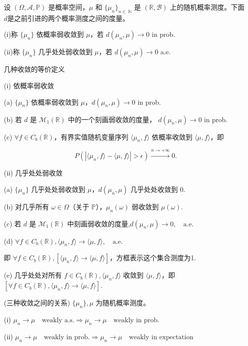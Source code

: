 \begin{definition}
    设 \((\Omega, \mathcal{A}, \mathbb{P})\) 是概率空间，\(\mu\) 和 \(\{\mu_n\}_{n\in\ \mathbb{N}}\) 是 \((\mathbb{R}, \mathcal{B})\) 上的随机概率测度。下面$d$是之前引进的两个概率测度之间的度量。

(i)称 \(\{\mu_n\}\) 依概率弱收敛到 \(\mu\)，若 \(d(\mu_n, \mu) \to 0\) in prob.

(ii)称 \(\{\mu_n\}\) 几乎处处弱收敛到 \(\mu\)，若 \(d(\mu_n,\mu) \to 0\) a.e.
\end{definition}

\begin{theorem}{几种收敛的等价定义}
   
    (i) 依概率弱收敛

(a) \(\{\mu_n\}\) 依概率弱收敛到 \(\mu\)，\(d(\mu_n, \mu) \to 0\) in prob.

(b) 若 \(d\) 是 \(\mathcal{M}_1(\mathbb{R})\) 中的一个刻画弱收敛的度量， \(d( \mu_n,  \mu) \to 0\) in prob.

(c) \(\forall f \in C_b(\mathbb{R})\)，有界实值随机变量序列 \(\langle  \mu_n, f \rangle\) 依概率收敛到 \(\langle  \mu, f \rangle\)，即

\begin{equation*}
P(|\langle  \mu_n, f \rangle - \langle  \mu, f \rangle| > \epsilon) \xrightarrow{n \to +\infty} 0.
\end{equation*}

(ii) 几乎处处弱收敛

(a) \(\{ \mu_n\}\) 几乎处处弱收敛到 \( \mu\)，\(d( \mu_n,  \mu)\) 几乎处处收敛到 \(0\).

(b) 对几乎所有 \(\omega \in \Omega\)（关于 \(\mathbb{P}\)），\( \mu_n(\omega)\) 弱收敛到 \( \mu(\omega)\).

(c) 若 \(d\) 是 \(\mathcal{M}_1(\mathbb{R})\) 中刻画弱收敛的度量,\(d( \mu_n,  \mu) \to 0 , \quad \text{a.e}\).

(d) \(\forall f \in C_b(\mathbb{R}), \langle \mu_n, f \rangle \to \langle\mu, f \rangle, \quad \text{a.e.}\)

即 \(\forall f \in C_b(\mathbb{R}), [\langle \mu_n, f \rangle \to \langle \mu, f \rangle]\)，方框表示这个集合测度为1.

(e) 几乎处处对所有 \(f \in C_b(\mathbb{R}), \langle \mu_n, f \rangle\) 收敛到 \(\langle \mu, f \rangle\)，即
\([\forall f \in C_b(\mathbb{R}), \langle \mu_n, f \rangle \to \langle \mu, f \rangle]\).

\end{theorem}
\begin{theorem}{(三种收敛之间的关系)}
    \(\{\mu_n\}, \mu\) 为随机概率测度。

(i) \(\mu_n \to\mu \quad \text{weakly a.s.} \Rightarrow \mu_n \to \mu \quad \text{weakly in prob.}\)

(ii) \(\mu_n \to \mu \quad \text{weakly in prob.} \Rightarrow \mu_n \to \mu\quad \text{weakly in expectation}\)
\end{theorem}
